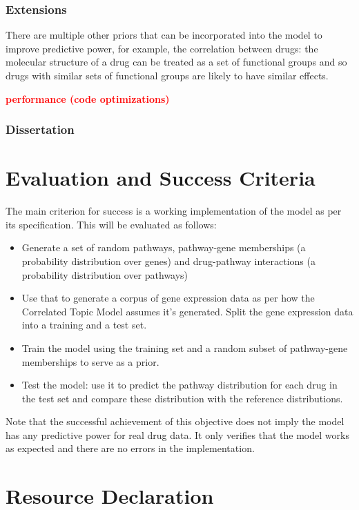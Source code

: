 \documentclass[12pt,a4]{article}
\begin{document}
\subsubsection*{Extensions}
There are multiple other priors that can be incorporated into the model to improve predictive power, for example, the correlation between drugs: the molecular structure of a drug can be treated as a set of functional groups and so drugs with similar sets of functional groups are likely to have similar effects.

{\bf \textcolor{red}{performance (code optimizations)}}

\subsubsection*{Dissertation}

\section*{Evaluation and Success Criteria}

The main criterion for success is a working implementation of the model as per its specification. This will be evaluated as follows:
\begin{itemize} 
\item Generate a set of random pathways, pathway-gene memberships (a probability distribution over genes) and drug-pathway interactions (a probability distribution over pathways)
\item Use that to generate a corpus of gene expression data as per how the Correlated Topic Model assumes it's generated. Split the gene expression data into a training and a test set.
\item Train the model using the training set and a random subset of pathway-gene memberships to serve as a prior.
\item Test the model: use it to predict the pathway distribution for each drug in the test set and compare these distribution with the reference distributions.
\end{itemize}

Note that the successful achievement of this objective does not imply the model has any predictive power for real drug data. It only verifies that the model works as expected and there are no errors in the implementation.

\section*{Resource Declaration}
\end{document}
